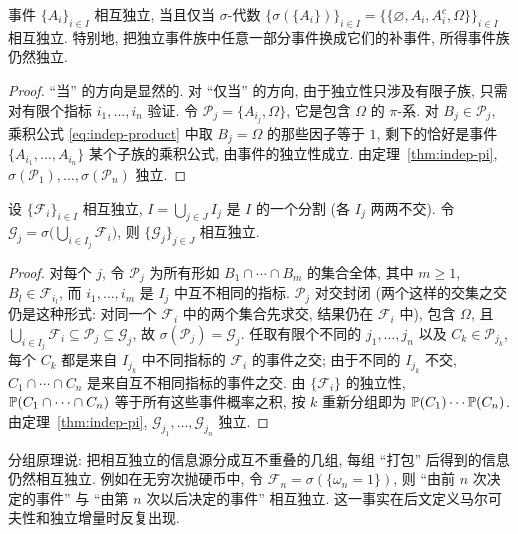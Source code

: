 \begin{corollary}\label{cor:indep-events-sigma}
事件 $\{A_i\}_{i\in I}$ 相互独立, 当且仅当 $\sigma$-代数 $\{\sigma(\{A_i\})\}_{i\in I}=\{\{\varnothing,A_i,A_i^c,\Omega\}\}_{i\in I}$ 相互独立. 特别地, 把独立事件族中任意一部分事件换成它们的补事件, 所得事件族仍然独立.
\end{corollary}

\begin{proof}
``当'' 的方向是显然的. 对 ``仅当'' 的方向, 由于独立性只涉及有限子族, 只需对有限个指标 $i_1,\dots,i_n$ 验证. 令 $\mathcal{P}_j=\{A_{i_j},\Omega\}$, 它是包含 $\Omega$ 的 $\pi$-系. 对 $B_j\in\mathcal{P}_j$, 乘积公式 \eqref{eq:indep-product} 中取 $B_j=\Omega$ 的那些因子等于 $1$, 剩下的恰好是事件 $\{A_{i_1},\dots,A_{i_n}\}$ 某个子族的乘积公式, 由事件的独立性成立. 由定理~\ref{thm:indep-pi}, $\sigma(\mathcal{P}_1),\dots,\sigma(\mathcal{P}_n)$ 独立.
\end{proof}

\begin{corollary}[分组原理]\label{cor:grouping}
设 $\{\mathcal{F}_i\}_{i\in I}$ 相互独立, $I=\bigcup_{j\in J}I_j$ 是 $I$ 的一个分割 (各 $I_j$ 两两不交). 令 $\mathcal{G}_j=\sigma\big(\bigcup_{i\in I_j}\mathcal{F}_i\big)$, 则 $\{\mathcal{G}_j\}_{j\in J}$ 相互独立.
\end{corollary}

\begin{proof}
对每个 $j$, 令 $\mathcal{P}_j$ 为所有形如 $B_1\cap\cdots\cap B_m$ 的集合全体, 其中 $m\ge1$, $B_l\in\mathcal{F}_{i_l}$, 而 $i_1,\dots,i_m$ 是 $I_j$ 中互不相同的指标. $\mathcal{P}_j$ 对交封闭 (两个这样的交集之交仍是这种形式: 对同一个 $\mathcal{F}_i$ 中的两个集合先求交, 结果仍在 $\mathcal{F}_i$ 中), 包含 $\Omega$, 且 $\bigcup_{i\in I_j}\mathcal{F}_i\subseteq\mathcal{P}_j\subseteq\mathcal{G}_j$, 故 $\sigma(\mathcal{P}_j)=\mathcal{G}_j$. 任取有限个不同的 $j_1,\dots,j_n$ 以及 $C_k\in\mathcal{P}_{j_k}$, 每个 $C_k$ 都是来自 $I_{j_k}$ 中不同指标的 $\mathcal{F}_i$ 的事件之交; 由于不同的 $I_{j_k}$ 不交, $C_1\cap\cdots\cap C_n$ 是来自互不相同指标的事件之交. 由 $\{\mathcal{F}_i\}$ 的独立性,
$\P(C_1\cap\cdots\cap C_n)$ 等于所有这些事件概率之积, 按 $k$ 重新分组即为 $\P(C_1)\cdots\P(C_n)$. 由定理~\ref{thm:indep-pi}, $\mathcal{G}_{j_1},\dots,\mathcal{G}_{j_n}$ 独立.
\end{proof}

\begin{intuition}
分组原理说: 把相互独立的信息源分成互不重叠的几组, 每组 ``打包'' 后得到的信息仍然相互独立. 例如在无穷次抛硬币中, 令 $\mathcal{F}_n=\sigma(\{\omega_n=1\})$, 则 ``由前 $n$ 次决定的事件'' 与 ``由第 $n$ 次以后决定的事件'' 相互独立. 这一事实在后文定义马尔可夫性和独立增量时反复出现.
\end{intuition}

